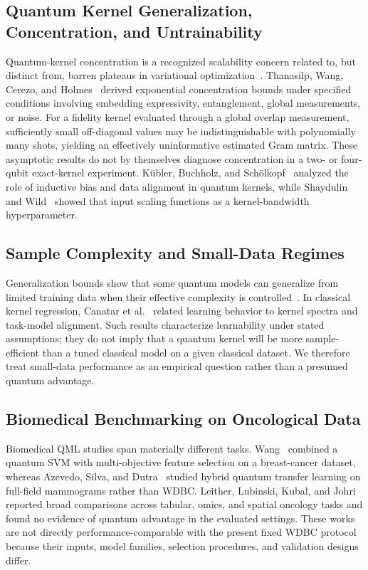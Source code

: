 \documentclass[12pt,a4paper]{article}
\begin{document}
\subsection{Quantum Kernel Generalization, Concentration, and Untrainability}
Quantum-kernel concentration is a recognized scalability concern related to, but distinct from, barren plateaus in variational optimization~\cite{mcclean2018barren, holmes2022connecting}. Thanasilp, Wang, Cerezo, and Holmes~\cite{thanasilp2024exponential} derived exponential concentration bounds under specified conditions involving embedding expressivity, entanglement, global measurements, or noise. For a fidelity kernel evaluated through a global overlap measurement, sufficiently small off-diagonal values may be indistinguishable with polynomially many shots, yielding an effectively uninformative estimated Gram matrix. These asymptotic results do not by themselves diagnose concentration in a two- or four-qubit exact-kernel experiment. K{\"u}bler, Buchholz, and Sch{\"o}lkopf~\cite{kubler2021inductive} analyzed the role of inductive bias and data alignment in quantum kernels, while Shaydulin and Wild~\cite{shaydulin2022importance} showed that input scaling functions as a kernel-bandwidth hyperparameter.

\subsection{Sample Complexity and Small-Data Regimes}
Generalization bounds show that some quantum models can generalize from limited training data when their effective complexity is controlled~\cite{caro2022generalization, banchi2021generalization}. In classical kernel regression, Canatar et al.~\cite{canatar2021spectral} related learning behavior to kernel spectra and task-model alignment. Such results characterize learnability under stated assumptions; they do not imply that a quantum kernel will be more sample-efficient than a tuned classical model on a given classical dataset. We therefore treat small-data performance as an empirical question rather than a presumed quantum advantage.

\subsection{Biomedical Benchmarking on Oncological Data}
Biomedical QML studies span materially different tasks. Wang~\cite{wang2024novel} combined a quantum SVM with multi-objective feature selection on a breast-cancer dataset, whereas Azevedo, Silva, and Dutra~\cite{azevedo2022quantum} studied hybrid quantum transfer learning on full-field mammograms rather than WDBC. Leither, Lubinski, Kubal, and Johri~\cite{leither2026benchmarking} reported broad comparisons across tabular, omics, and spatial oncology tasks and found no evidence of quantum advantage in the evaluated settings. These works are not directly performance-comparable with the present fixed WDBC protocol because their inputs, model families, selection procedures, and validation designs differ.
\end{document}
